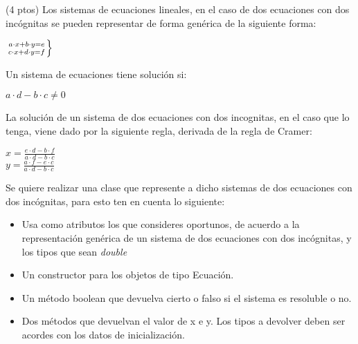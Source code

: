 \documentclass[addpoints,12pt]{exam}
\begin{document}
\begin{center}
\end{center}
\vspace{0.1in}
\begin{questions}
\question(4 ptos)  Los sistemas de ecuaciones lineales, en el caso de dos ecuaciones con dos incógnitas se pueden representar de forma genérica de la siguiente forma:
\begin{large}
\begin{center}
$\left.
a \cdot x + b \cdot y  = e \atop
c \cdot x + d \cdot y = f
\right\}$
\end{center}
\end{large}
Un sistema de ecuaciones tiene solución si:
\begin{center}
$a \cdot d - b \cdot c  \not= 0$
\end{center}
La solución de un sistema de dos ecuaciones con dos incognitas, en el caso que lo tenga, viene dado por la siguiente regla, derivada de la regla de Cramer:
\begin{large}
\begin{center}
$x = \frac{e \cdot d - b \cdot f}{a \cdot d - b \cdot c}$ \\
\vspace*{0.2cm}
$y = \frac{a \cdot f - e \cdot c}{a \cdot d - b \cdot c}$
\end{center}
\end{large}
Se quiere realizar una clase que represente a dicho sistemas de dos ecuaciones con dos incógnitas, para esto ten en cuenta lo siguiente:
\begin{itemize}
\item Usa como atributos los que consideres oportunos, de acuerdo a la representación genérica de un sistema de dos ecuaciones con dos incógnitas, y los tipos que sean \emph{double}
\item Un constructor para los objetos de tipo Ecuación.
\item Un método boolean que devuelva cierto o falso si el sistema es resoluble o no.
\item Dos métodos que devuelvan el valor de x e y. Los tipos a devolver deben ser acordes con los datos de inicialización.
\end{itemize}
\begin{parts}

\end{parts}
\end{questions}
\end{document}
